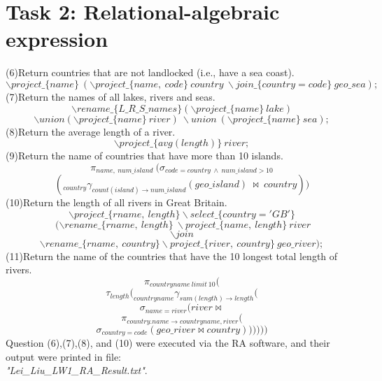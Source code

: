 \documentclass[10pt]{article}
\begin{document}
\section{Task 2: Relational-algebraic expression}
(6)Return countries that are not landlocked (i.e., have a sea coast).
$$ \backslash project\_\{name\} \ (\backslash project\_\{name, \ code\}\  country \  \backslash join\_ \{country=code\} \ geo\_sea);$$
(7)Return the names of all lakes, rivers and seas.
$$ \backslash rename\_\{ L\_R\_S\_names\} (  \backslash project\_\{name\} \ lake) $$$$ \backslash union ( \backslash project\_\{name\} \ river) \ \backslash union \   ( \backslash project\_\{name\} \ sea);$$
(8)Return the average length of a river.
$$ \backslash project\_\{avg(length)\} \ river;$$
(9)Return the name of countries that have more than 10 islands.
$$\pi_{name, \ num\_island} \  ( \sigma_{code=country \ \wedge \ num\_island>10} $$$$ ( _{country} \gamma_{count(island) \rightarrow num\_island } (geo\_island ) \ \bowtie  \ country ) )$$
\newpage
(10)Return the length of all rivers in Great Britain.
$$ \backslash project\_\{rname, \ length\}  \backslash select\_\{country = 'GB'\} $$$$ \ ( \backslash rename\_\{rname, \ length\} \   \backslash project\_\{name, \  length\} \ river $$$$  \backslash join $$$$  \backslash rename\_\{rname, \  country\}  \backslash project\_\{river, \ country\} \ geo\_river);$$
(11)Return the name of the countries that have the 10 longest total length of rivers.
$$\pi_{countryname \ limit \ 10}( $$$$
\tau _{length}(
_{countryname} \gamma _{sum(length) \rightarrow length}( $$$$ 
\sigma_{name=river}(
river\bowtie $$$$
\pi_{country.name\rightarrow countryname, river}( $$$$
\sigma_{country=code}(
geo\_river \bowtie country))))))$$
Question (6),(7),(8), and (10) were executed via the RA software, and their output were printed in file:\\ \textit{"Lei\_Liu\_LW1\_RA\_Result.txt"}.
\end{document}
